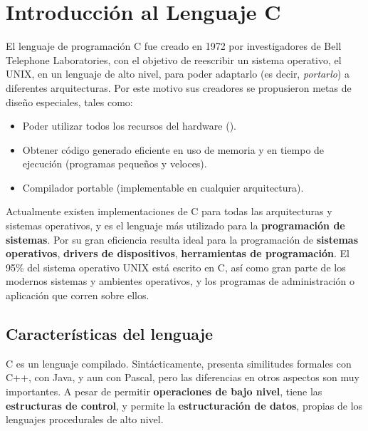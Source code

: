 
\chapter{Introducción al Lenguaje C}
\label{sec:tc-introduccion}



El lenguaje de programación C fue creado en 1972 por investigadores de 
Bell Telephone Laboratories, con el objetivo de reescribir un sistema
operativo, el UNIX, en un lenguaje de alto nivel, para poder adaptarlo
(es decir, \textit{portarlo}) a diferentes arquitecturas. Por este motivo sus
creadores se propusieron metas de diseño especiales, tales como: 

\begin{itemize}
\item Poder utilizar todos los recursos del hardware (). 
\item Obtener código generado eficiente en uso de memoria y en tiempo de ejecución (programas pequeños y veloces).
\item Compilador portable (implementable en cualquier arquitectura).
\end{itemize}


Actualmente existen implementaciones de C para todas las arquitecturas y
sistemas operativos, y es el lenguaje más utilizado para la
\textbf{programación de sistemas}. Por su gran eficiencia resulta ideal para
la programación de \textbf{sistemas operativos}, \textbf{drivers de dispositivos},
\textbf{herramientas de programación}. El 95\% del sistema operativo UNIX
está escrito en C, así como gran parte de los modernos
sistemas y ambientes operativos, y los programas de administración o aplicación que corren
sobre ellos.


\section{Características del lenguaje}
C es un lenguaje compilado. Sintácticamente, presenta similitudes formales 
con C++, con Java, y aun con Pascal, pero las diferencias en otros aspectos son muy
importantes. A pesar de permitir \textbf{operaciones de bajo nivel}, tiene las
\textbf{estructuras de control}, y permite la \textbf{estructuración de datos}, propias
de los lenguajes procedurales de alto nivel. 

